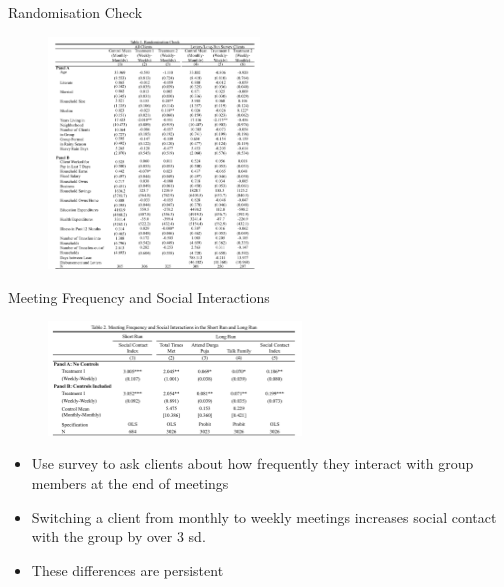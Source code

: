 \documentclass[11pt,notes=hide,aspectratio=169,mathserif]{beamer}
\begin{document}
\begin{frame}{Randomisation Check}
\begin{figure}
    \centering
    \includegraphics[width=0.5\textwidth]{inputs/Fig1.png}
\end{figure}
\end{frame}

\begin{frame}{Meeting Frequency and Social Interactions}
\begin{figure}
    \centering
    \includegraphics[width=0.6\textwidth]{inputs/Fig2.png}
\end{figure}
\begin{itemize}
    \pause \item Use survey to ask clients about how frequently they interact with group members at the end of meetings 
    \pause \item Switching a client from monthly to weekly meetings increases social contact with the group by over 3 sd. 
    \pause \item These differences are persistent 
\end{itemize}
\end{frame}
\end{document}
